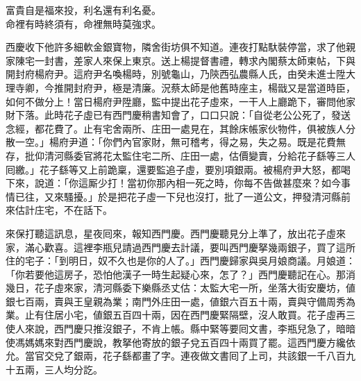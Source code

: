\begin{myquote}
富貴自是福來投，利名還有利名憂。\\命裡有時終須有，命裡無時莫強求。
\end{myquote}

西慶收下他許多細軟金銀寶物，隣舍街坊俱不知道。連夜打點馱裝停當，求了他親家陳宅一封書，差家人來保上東京。送上楊提督書禮，轉求內閣蔡太師柬帖，下與開封府楊府尹。這府尹名喚楊時，別號龜山，乃陝西弘農縣人氏，由癸未進士陞大理寺卿，今推開封府尹，極是清廉。況蔡太師是他舊時座主，楊戩又是當道時臣，如何不做分上！{}當日楊府尹陞廳，監中提出花子虛來，一干人上廳跪下，審問他家財下落。此時花子虛已有西門慶稍書知會了，口口只說：「自從老公公死了，發送念經，都花費了。止有宅舍兩所、庄田一處見在，其餘床帳家伙物件，俱被族人分散一空。」楊府尹道：「你們內官家財，無可稽考，得之易，失之易。既是花費無存，批仰清河縣委官將花太監住宅二所、庄田一處，估價變賣，分給花子繇等三人囘繳。」花子繇等又上前跪稟，還要監追子虛，要別項銀兩。被楊府尹大怒，都喝下來，說道：「你這厮少打！當初你那內相一死之時，你每不告做甚麼來？如今事情已往，又來騷擾。」於是把花子虛一下兒也沒打，批了一道公文，押發清河縣前來估計庄宅，不在話下。

來保打聽這訊息，星夜囘來，報知西門慶。西門慶聽見分上準了，放出花子虛來家，滿心歡喜。這裡李瓶兒請過西門慶去計議，要叫西門慶拏幾兩銀子，買了這所住的宅子：「到明日，奴不久也是你的人了。」{}西門慶歸家與吳月娘商議。月娘道：「你若要他這房子，恐怕他漢子一時生起疑心來，怎了？」西門慶聽記在心。那消幾日，花子虛來家，清河縣委下樂縣丞丈估：太監大宅一所，坐落大街安慶坊，値銀七百兩，賣與王皇親為業；南門外庄田一處，値銀六百五十兩，賣與守備周秀為業。止有住居小宅，値銀五百四十兩，因在西門慶緊隔壁，沒人敢買。花子虛再三使人來說，西門慶只推沒銀子，不肯上帳。縣中緊等要囘文書，李瓶兒急了，暗暗使馮媽媽來對西門慶說，教拏他寄放的銀子兌五百四十兩買了罷。這西門慶方纔依允。當官交兌了銀兩，花子繇都畫了字。連夜做文書囘了上司，共該銀一千八百九十五兩，三人均分訖。

